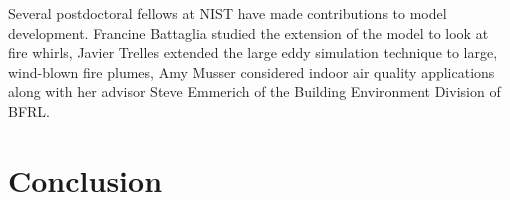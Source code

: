 \documentclass[11pt]{book}
\begin{document}
Several postdoctoral fellows at NIST have made contributions to model
development. Francine Battaglia studied the extension of the model to
look at fire whirls, Javier Trelles extended the large eddy simulation
technique to large, wind-blown fire plumes, Amy Musser considered
indoor air quality applications along with her advisor Steve Emmerich
of the Building Environment Division of BFRL.




\tableofcontents

\mainmatter

















\chapter{Conclusion}



\backmatter


%

%


\end{document}
